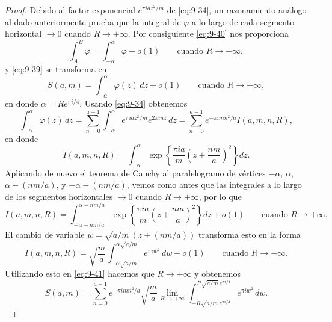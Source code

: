 \documentclass[12pt,a4paper]{book}
\begin{document}
\begin{proof}
        Debido al factor exponencial $e^{\pi iaz^{2}/m}$ de \eqref{eq:9-34}, un razonamiento
        análogo al dado anteriormente prueba que la integral de $\varphi$ a lo largo de
        cada segmento horizontal $\to0$ cuando $R\to+\infty$. Por consiguiente
        \eqref{eq:9-40} nos proporciona
        \begin{equation*}
            \int_{A}^{B}\varphi=\int_{-\alpha}^{\alpha}\varphi+o(1)\qquad\text{cuando }R\to+\infty,
        \end{equation*}
        y \eqref{eq:9-39} se transforma en
        \begin{equation}\label{eq:9-41}
            S(a,m)=\int_{-\alpha}^{\alpha}\varphi(z)\,dz+o(1)\qquad\text{cuando }R\to+\infty,
        \end{equation}
        en donde $\alpha=Re^{\pi i/4}$. Usando \eqref{eq:9-34} obtenemos
        \begin{equation*}
            \int_{-\alpha}^{\alpha}\varphi(z)\,dz=\sum_{n=0}^{a-1}\int_{-\alpha}^{\alpha}e^{\pi iaz^{2}/m}e^{2\pi inz}\,dz=\sum_{n=0}^{a-1}e^{-\pi imn^{2}/a}I(a,m,n,R),
        \end{equation*}
        en donde
        \begin{equation*}
            I(a,m,n,R)=\int_{-\alpha}^{\alpha}\exp\left\{\frac{\pi ia}{m}\left(z+\frac{nm}{a}\right)^{2}\right\}dz.
        \end{equation*}
        Aplicando de nuevo el teorema de Cauchy al paralelogramo de vértices $-\alpha$,
        $\alpha$, $\alpha-(nm/a)$, y $-\alpha-(nm/a)$, vemos como antes que las integrales
        a lo largo de los segmentos horizontales $\to0$ cuando $R\to+\infty$, por lo que
        \begin{equation*}
            I(a,m,n,R)=\int_{-\alpha-nm/a}^{\alpha-nm/a}\exp\left\{\frac{\pi ia}{m}\left(z+\frac{nm}{a}\right)^{2}\right\}dz+o(1)\qquad\text{cuando }R\to+\infty.
        \end{equation*}
        El cambio de variable $w=\sqrt{a/m}\,(z+(nm/a))$ transforma esto en la forma
        \begin{equation*}
            I(a,m,n,R)=\sqrt{\frac{m}{a}}\int_{-\alpha\sqrt{a/m}}^{\alpha\sqrt{a/m}}e^{\pi iw^{2}}\,dw+o(1)\qquad\text{cuando }R\to+\infty.
        \end{equation*}
        Utilizando esto en \eqref{eq:9-41} hacemos que $R\to+\infty$ y obtenemos
        \begin{equation}\label{eq:9-42}
            S(a,m)=\sum_{n=0}^{a-1}e^{-\pi imn^{2}/a}\sqrt{\frac{m}{a}}\lim_{R\to+\infty}\int_{-R\sqrt{a/m}\,e^{\pi i/4}}^{R\sqrt{a/m}\,e^{\pi i/4}}e^{\pi iw^{2}}\,dw.

\end{equation}
\end{proof}
\end{document}
